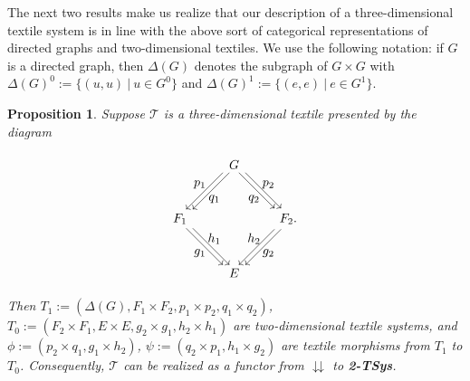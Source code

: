 \documentclass[a4paper,reqno,12pt]{amsart}
\newtheorem{prop}[thm]{Proposition}
\theoremstyle{definition}
\theoremstyle{remark}
\begin{document}
The next two results make us realize that our description of a three-dimensional textile system is in line with the above sort of categorical representations of directed graphs and two-dimensional textiles. We use the following notation: if $G$ is a directed graph, then $\Delta(G)$ denotes the subgraph of $G\times G$ with $\Delta(G)^0:=\{(u,u)~|~u\in G^0\}$ and $\Delta(G)^1:=\{(e,e)~|~e\in G^1\}$. 
\begin{prop}\label{pro categorical realization of 3D textiles}
Suppose $\mathcal{T}$ is a three-dimensional textile presented by the diagram 

\[
\begin{tikzpicture}[scale=1]
\node[inner sep=2.5pt, circle] (B) at (-1.5,0) {$F_1$};
\node[inner sep=2.5pt, circle] (C) at (1.5,0) {$F_2.$};	
\node[inner sep=2.5pt, circle] (D) at (0,-1.5) {$E$};
\node[inner sep=2.5pt, circle] (A) at (0,1.5) {$G$}; 

\draw[transform canvas={xshift=0.6ex}, ->] (A) -- (B);
\draw[transform canvas={xshift=-0.6ex}, ->] (A) -- (B);

\draw[transform canvas={xshift=0.6ex}, ->] (A) -- (C);
\draw[transform canvas={xshift=-0.6ex}, ->] (A) -- (C);

\draw[transform canvas={xshift=0.6ex}, ->] (C) -- (D);
\draw[transform canvas={xshift=-0.6ex}, ->] (C) -- (D);

\draw[transform canvas={xshift=0.6ex}, ->] (B) -- (D);
\draw[transform canvas={xshift=-0.6ex}, ->] (B) -- (D);

\node at (-0.55,0.55) {$q_1$};
\node at (-0.95,0.95) {$p_1$};

\node at (0.55,0.55) {$q_2$};
\node at (0.95,0.95) {$p_2$};

\node at (-0.55,-0.55) {$h_1$};
\node at (-0.95,-0.95) {$g_1$};

\node at (0.55,-0.55) {$h_2$};
\node at (0.95,-0.95) {$g_2$};
\end{tikzpicture}
\]
Then $T_1:=(\Delta(G),F_1\times F_2, p_1\times p_2,q_1\times q_2)$, $T_0:=(F_2\times F_1, E\times E, g_2\times g_1, h_2\times h_1)$ are two-dimensional textile systems, and $\phi:=(p_2\times q_1,g_1\times h_2)$, $\psi:=(q_2\times p_1, h_1\times g_2)$ are textile morphisms from $T_1$ to $T_0$. Consequently, $\mathcal{T}$ can be realized as a functor from $\downdownarrows$ to \textup{\textbf{2-TSys}}. 
\end{prop}
\end{document}
